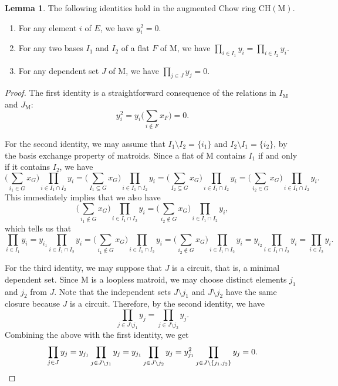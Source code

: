 \documentclass[11pt,reqno]{amsart}
\theoremstyle{definition}
\newtheorem{lemma}[theorem]{Lemma}
\theoremstyle{remark}
\renewcommand{\(}{\left(}
\renewcommand{\)}{\right)}
\newcommand{\<}{\left<}
\renewcommand{\>}{\right>}
\begin{document}
\begin{lemma}\label{PropositionIdentities}
The following identities hold in the augmented Chow ring $\mathrm{CH}(\mathrm{M})$.
\begin{enumerate}[(1)]\itemsep 5pt
\item For any element $i$ of $E$, we have  $y_i^2=0$.
\item For any two bases $I_1$ and $I_2$ of a flat $F$ of $\mathrm{M}$, we have $\prod_{i \in I_1} y_i = \prod_{i\in I_2} y_i$.
\item For any dependent set $J$ of $\mathrm{M}$, we have
$\prod_{j \in J} y_j=0$.
\end{enumerate}
\end{lemma}

\begin{proof}
The first identity is a straightforward consequence of the relations in $I_\mathrm{M}$ and $J_\mathrm{M}$:
\[
y_i^2=y_i \Big( \sum_{i \notin F} x_F\Big)=0. %
\]

For the second identity, 
we may assume that $I_1 \setminus I_2=\{i_1\}$ and $I_2 \setminus I_1 =\{i_2\}$,
by the basis exchange property of matroids.
Since a flat of $\mathrm{M}$ contains $I_1$ if and only if it contains $I_2$,
we have
\[
\Big(\sum_{i_1 \in G} x_G\Big)\prod_{i \in I_1 \cap I_2} y_i
=\Big(\sum_{I_1 \subseteq G} x_G\Big)\prod_{i \in I_1 \cap I_2} y_i
=
\Big(\sum_{I_2 \subseteq G} x_G\Big)\prod_{i \in I_1 \cap I_2} y_i
=\Big(\sum_{i_2 \in G} x_G\Big)\prod_{i \in I_1 \cap I_2} y_i.
\]
This immediately implies that we also have
$$\Big(\sum_{i_1 \notin G} x_G\Big)\prod_{i \in I_1 \cap I_2} y_i = \Big(\sum_{i_2 \notin G} x_G\Big)\prod_{i \in I_1 \cap I_2} y_i,$$
which tells us that
\[
\prod_{i \in I_1} y_i 
=
y_{i_1}\prod_{i \in I_1 \cap I_2} y_i
=
\Big(\sum_{i_1 \notin G} x_G\Big)\prod_{i \in I_1 \cap I_2} y_i
=
\Big(\sum_{i_2 \notin G} x_G\Big)\prod_{i \in I_1 \cap I_2} y_i
=
y_{i_2}\prod_{i \in I_1 \cap I_2} y_i
=
\prod_{i \in I_2} y_i. 
\]


For the third identity,
we may suppose that $J$ is a circuit, that is, a minimal dependent set.
Since $\mathrm{M}$ is a loopless matroid, we may choose distinct elements $j_1$ and $j_2$ from $J$.
Note that the independent sets $J \setminus j_1$ and $J \setminus j_2$ have the same closure because $J$ is a circuit.
Therefore, by the second identity, we have
\[
\prod_{j \in J \setminus j_1} y_j=
\prod_{j \in J \setminus j_2} y_j.
\]
Combining the above with the first identity, we get 
\[
\prod_{j \in J} y_j=
y_{j_1} \prod_{j \in J \setminus j_1} y_j=
y_{j_1} \prod_{j \in J \setminus j_2} y_j=
y_{j_1}^2 \prod_{j \in J \setminus \{j_1, j_2\}} y_j=0.\qedhere
\]
\end{proof}
\end{document}
